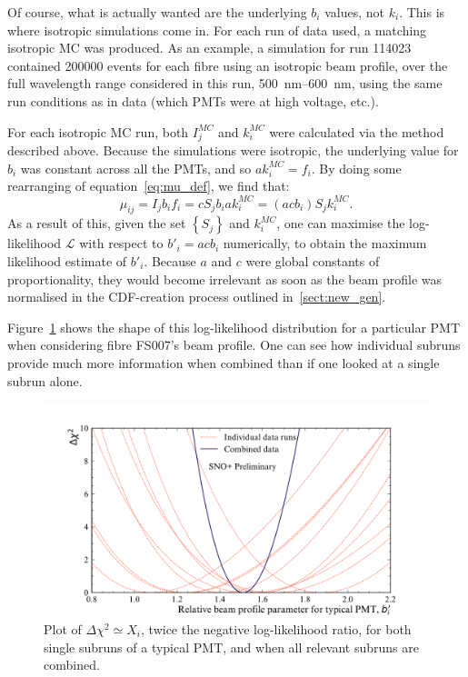 Of course, what is actually wanted are the underlying $b_{i}$ values, not $k_{i}$. This is where isotropic simulations come in. For each run of data used, a matching isotropic MC was produced. As an example, a simulation for run \num{114023} contained \num{200000} events for each fibre using an isotropic beam profile, over the full wavelength range considered in this run, \SIrange{500}{600}{\nano\metre}, using the same run conditions as in data (which PMTs were at high voltage, etc.).

For each isotropic MC run, both $I_{j}^{MC}$ and $k_{i}^{MC}$ were calculated via the method described above. Because the simulations were isotropic, the underlying value for $b_{i}$ was constant across all the PMTs, and so $ak_{i}^{MC} = f_{i}$. By doing some rearranging of equation~\ref{eq:mu_def}, we find that:
\begin{equation}
    \mu_{ij} = I_{j}b_{i}f_{i} = cS_{j}b_{i}ak_{i}^{MC} = (acb_{i})S_{j}k_{i}^{MC}.
\end{equation}
As a result of this, given the set $\left\{S_{j}\right\}$ and $k_{i}^{MC}$, one can maximise the log-likelihood $\mathcal{L}$ with respect to $b'_{i} = acb_{i}$ numerically, to obtain the maximum likelihood estimate of $b'_{i}$. Because $a$ and $c$ were global constants of proportionality, they would become irrelevant as soon as the beam profile was normalised in the CDF-creation process outlined in~\ref{sect:new_gen}.

Figure~\ref{fig:likelihood_scan} shows the shape of this log-likelihood distribution for a particular PMT when considering fibre FS007's beam profile. One can see how individual subruns provide much more information when combined than if one looked at a single subrun alone.

\begin{figure}
    \centering
    \includegraphics[width=0.8\linewidth]{5_SMELLIESimulation/images/example_likelihood_distribution_pmt_inc_all_subruns_proper_formatting.pdf}
    \caption{Plot of $\Delta\chi^2\simeq X_{i}$, twice the negative log-likelihood ratio, for both single subruns of a typical PMT, and when all relevant subruns are combined.}
    \label{fig:likelihood_scan}
\end{figure}

